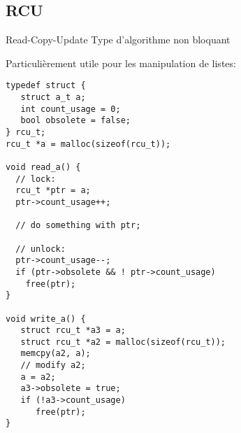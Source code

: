 \subsection{RCU}
\begin{frame}[fragile]{Read-Copy-Update}
Type d'algorithme non bloquant

Particulièrement utile pour les manipulation de listes:
\begin{lstlisting} 
typedef struct {
   struct a_t a;
   int count_usage = 0;
   bool obsolete = false;
} rcu_t;
rcu_t *a = malloc(sizeof(rcu_t)); 

void read_a() {
  // lock:
  rcu_t *ptr = a;
  ptr->count_usage++;

  // do something with ptr;

  // unlock:
  ptr->count_usage--;
  if (ptr->obsolete && ! ptr->count_usage)
    free(ptr);
}

void write_a() { 
   struct rcu_t *a3 = a;
   struct rcu_t *a2 = malloc(sizeof(rcu_t));
   memcpy(a2, a);
   // modify a2;   
   a = a2;  
   a3->obsolete = true;
   if (!a3->count_usage)
      free(ptr);
}
\end{lstlisting} 
\end{frame} 
